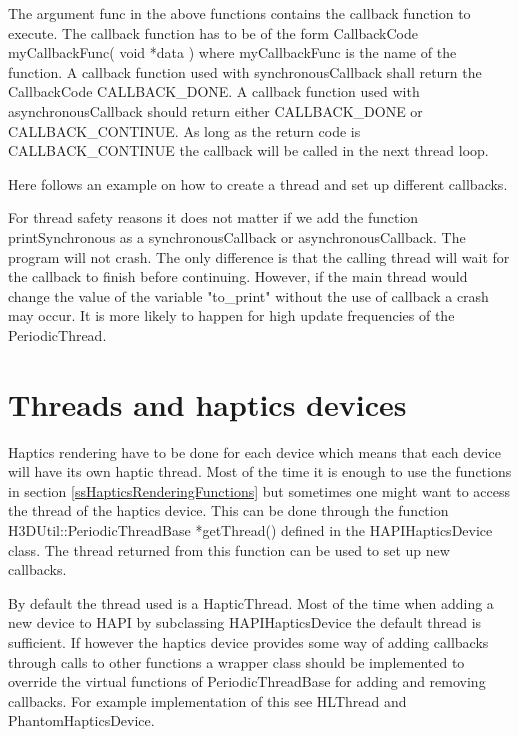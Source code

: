 The argument {\ttfamily func} in the above functions contains the callback function to
execute. The callback function has to be of the form
{\ttfamily CallbackCode myCallbackFunc( void *data )} where {\ttfamily myCallbackFunc} is the name of
the function. A callback function used with synchronousCallback shall
return the CallbackCode CALLBACK\_DONE. A callback function used with
asynchronousCallback should return either CALLBACK\_DONE or CALLBACK\_CONTINUE.
As long as the return code is CALLBACK\_CONTINUE the callback will be called in
the next thread loop.

Here follows an example on how to create a thread and set up different
callbacks.



For thread safety reasons it does not matter if we add the function
printSynchronous as a synchronousCallback or asynchronousCallback. The program
will not crash. The only difference is that the calling thread will wait for
the callback to finish before continuing. However, if the main thread would
change the value of the variable "to\_print" without the use of callback a
crash may occur. It is more likely to happen for high update frequencies of the
PeriodicThread.

\section{Threads and haptics devices}
Haptics rendering have to be done for each device which means that each device
will have its own haptic thread. Most of the time it is enough to use the
functions in section \ref{ssHapticsRenderingFunctions} but sometimes one might
want to access the thread of the haptics device. This can be done through the
function {\ttfamily H3DUtil::PeriodicThreadBase *getThread()} defined in the
HAPIHapticsDevice class. The thread returned from this function can be used
to set up new callbacks.

By default the thread used is a HapticThread. Most of the time when adding a
new device to HAPI by subclassing HAPIHapticsDevice the default thread is
sufficient. If however the haptics device provides some way of adding callbacks
through calls to other functions a wrapper class should be implemented
to override the virtual functions of PeriodicThreadBase for adding and removing
callbacks. For example implementation of this see HLThread and PhantomHapticsDevice.
